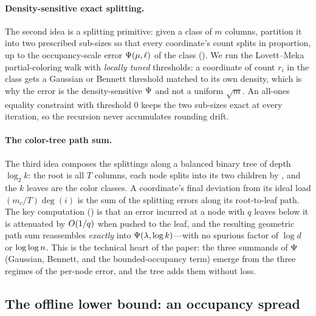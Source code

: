 \paragraph{Density-sensitive exact splitting.}
The second idea is a splitting primitive: given a class of $m$ columns, partition it into two prescribed sub-sizes so that
every coordinate's count splits in proportion, up to the occupancy-scale error $\Psi(\mu,\ell)$ of the class
(). We run the Lovett--Meka partial-coloring walk \cite{LovettMeka2015} with \emph{locally tuned} thresholds:
a coordinate of count $r_i$ in the class gets a Gaussian or Bennett threshold matched to its own density, which is why the
error is the density-sensitive $\Psi$ and not a uniform $\sqrt{m}$. An all-ones equality constraint with threshold $0$
keeps the two sub-sizes exact at every iteration, so the recursion never accumulates rounding drift.

\paragraph{The color-tree path sum.}
The third idea composes the splittings along a balanced binary tree of depth $\log_2 k$: the root is all $T$ columns, each
node splits into its two children by , and the $k$ leaves are the color classes. A coordinate's final
deviation from its ideal load $(m_c/T)\deg(i)$ is the sum of the splitting errors along its root-to-leaf path. The key
computation () is that an error incurred at a node with $q$ leaves below it is attenuated by $O(1/q)$
when pushed to the leaf, and the resulting geometric path sum reassembles \emph{exactly} into $\Psi(\lambda,\log k)$---with no
spurious factor of $\log d$ or $\log\log n$. This is the technical heart of the paper: the three summands of $\Psi$ (Gaussian,
Bennett, and the bounded-occupancy term) emerge from the three regimes of the per-node error, and the tree adds them without
loss.

\subsection{The offline lower bound: an occupancy spread}\label{sec:ov-offline-lower}

